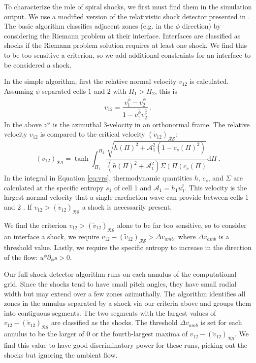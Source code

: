 \documentclass{emulateapj}
\newcommand{\Sig}{\Sigma}
\newcommand{\dd}{\mbox{d}}
\begin{document}
To characterize the role of spiral shocks, we first must find them in the simulation output.  We use a modified version of the relativistic shock detector presented in \cite{Zanotti10}.  The basic algorithm classifies adjacent zones (e.g. in the $\phi$ direction) by considering the Riemann problem at their interface.  Interfaces are classified as shocks if the Riemann problem solution requires at least one shock.  We find this to be too sensitive a criterion, so we add additional constraints for an interface to be considered a shock.

In the simple algorithm, first the relative normal velocity $v_{12}$ is calculated.  Assuming $\phi$-separated cells $1$ and $2$ with $\Pi_1 > \Pi_2$, this is
\begin{equation}
	v_{12} = \frac{v^{\hat{\phi}}_1 - v^{\hat{\phi}}_2}{1 - v^{\hat{\phi}}_1 v^{\hat{\phi}}_2} \ . \label{eq:vrel}
\end{equation}
In the above $v^{\hat{\phi}}$ is the azimuthal 3-velocity in an orthonormal frame. The relative velocity $v_{12}$ is compared to the critical velocity $(\tilde{v}_{12})_{\mathcal{R} \mathcal{S}}$:
\begin{equation}
	(v_{12})_{\mathcal{R}\mathcal{S}} = \tanh \int_{\Pi_1}^{\Pi_2} \frac{\sqrt{h(\Pi)^2 + \mathcal{A}_1^2(1-c_s(\Pi)^2)}}{(h(\Pi)^2 + \mathcal{A}_1^2)\Sig(\Pi) c_s(\Pi)} \dd \Pi \ . \label{eq:vrs}
\end{equation}  
In the integral in Equation \eqref{eq:vrs}, thermodynamic quantities $h$, $c_s$, and $\Sig$ are calculated at the specific entropy $s_1$ of cell 1 and $\mathcal{A}_1 = h_1 u_1^{\hat{r}}$.  This velocity is the largest normal velocity that a single rarefaction wave can provide between cells 1 and 2    \citep{Rezzolla03}.  If $v_{12} > (\tilde{v}_{12})_{\mathcal{R}\mathcal{S}}$ a shock is necessarily present.

We find the criterion $v_{12} > (\tilde{v}_{12})_{\mathcal{R}\mathcal{S}}$ alone to be far too sensitive, so to consider an interface a shock, we require $v_{12} - (\tilde{v}_{12})_{\mathcal{R}\mathcal{S}} > \Delta v_{amb}$, where $\Delta v_{amb}$ is a threshold value.  Lastly, we require the specific entropy to increase in the direction of the flow: $u^\phi \partial_\phi s > 0$.

Our full shock detector algorithm runs on each annulus of the computational grid.  Since the shocks tend to have small pitch angles, they have small radial width but may extend over a few zones azimuthally.  The algorithm identifies all zones in the annulus separated by a shock via our criteria above and groups them into contiguous segments.  The two segments with the largest values of $v_{12} -  (\tilde{v}_{12})_{\mathcal{R}\mathcal{S}} $ are classified as the shocks. The threshold $\Delta v_{amb}$ is set for each annulus to be the larger of $0$ or the fourth-largest maxima of $v_{12} -  (\tilde{v}_{12})_{\mathcal{R}\mathcal{S}} $. We find this value to have good discriminatory power for these runs, picking out the shocks but ignoring the ambient flow.
\end{document}
